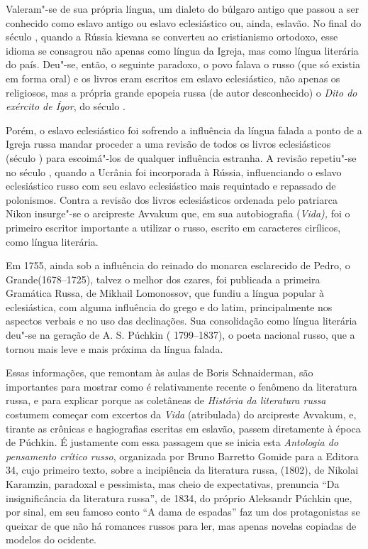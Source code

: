 Valeram"-se de sua própria língua, um dialeto do búlgaro antigo que
passou a ser conhecido como eslavo antigo ou eslavo eclesiástico ou,
ainda, eslavão. No final do século , quando a Rússia kievana se
converteu ao cristianismo ortodoxo, esse idioma se consagrou não apenas
como língua da Igreja, mas como língua literária do país. Deu"-se, então,
o seguinte paradoxo, o povo falava o russo (que só existia em forma
oral) e os livros eram
escritos em eslavo eclesiástico, não apenas os religiosos, mas a própria
grande epopeia russa (de autor desconhecido) o \emph{Dito do exército de
Ígor}, do século .

Porém, o eslavo eclesiástico foi sofrendo a influência da língua falada
a ponto de a Igreja russa mandar proceder a uma revisão de todos os
livros eclesiásticos (século ) para escoimá"-los de qualquer
influência estranha. A revisão repetiu"-se no século , quando a
Ucrânia foi incorporada à Rússia, influenciando o eslavo eclesiástico
russo com seu eslavo eclesiástico mais requintado e repassado de
polonismos. Contra a revisão dos livros eclesiásticos ordenada pelo
patriarca Nikon insurge"-se o arcipreste Avvakum que, em sua
autobiografia (\emph{Vida),} foi o primeiro escritor importante a
utilizar o russo, escrito em caracteres cirílicos, como língua literária.

Em 1755, ainda sob a influência do reinado do monarca esclarecido de Pedro, o
Grande(1678--1725), talvez o melhor dos czares, foi publicada a primeira
Gramática Russa, de Mikhail Lomonossov, que fundiu a língua popular à
eclesiástica, com alguma influência do grego e do latim,
 principalmente nos aspectos verbais e no uso das declinações. Sua
consolidação como língua literária deu"-se na geração de A. S. Púchkin (
1799--1837), o poeta nacional russo, que a tornou mais leve e mais
próxima da língua falada.

Essas informações, que remontam às aulas de Boris Schnaiderman, são
importantes para mostrar como é relativamente recente o fenômeno da
literatura russa, e para explicar porque as coletâneas de \emph{História
da literatura russa} costumem começar com excertos da \emph{Vida} (atribulada) do arcipreste Avvakum, e, tirante as crônicas e hagiografias
escritas em eslavão, passem diretamente à época de Púchkin. É
justamente com essa passagem que se inicia esta \emph{Antologia do
pensamento crítico russo}, organizada por Bruno Barretto Gomide para a Editora 34, cujo
primeiro texto, sobre a incipiência da literatura russa, (1802), de
Nikolai Karamzin, paradoxal e pessimista, mas cheio de expectativas,
prenuncia ``Da insignificância da literatura russa'', de 1834, do
próprio Aleksandr Púchkin que, por sinal, em seu famoso conto ``A dama
de espadas'' faz um dos protagonistas se queixar de que não há romances
russos para ler, mas apenas novelas copiadas de modelos do ocidente.

